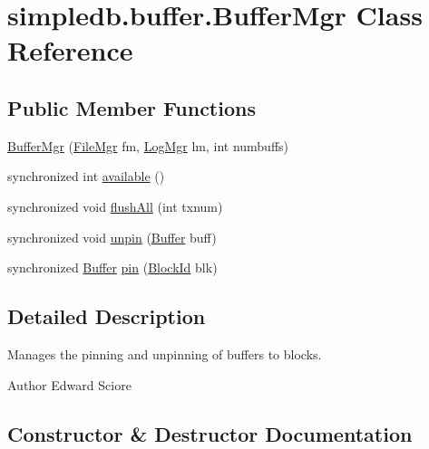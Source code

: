 \hypertarget{classsimpledb_1_1buffer_1_1BufferMgr}{}\section{simpledb.\+buffer.\+Buffer\+Mgr Class Reference}
\label{classsimpledb_1_1buffer_1_1BufferMgr}
\subsection*{Public Member Functions}
\begin{DoxyCompactItemize}
\item 
\hyperlink{classsimpledb_1_1buffer_1_1BufferMgr_a902992b92f80e884e735f164666b7f8e}{Buffer\+Mgr} (\hyperlink{classsimpledb_1_1file_1_1FileMgr}{File\+Mgr} fm, \hyperlink{classsimpledb_1_1log_1_1LogMgr}{Log\+Mgr} lm, int numbuffs)
\item 
synchronized int \hyperlink{classsimpledb_1_1buffer_1_1BufferMgr_a39e0c2c3184bbf6c15e3c7b2bd4151e0}{available} ()
\item 
synchronized void \hyperlink{classsimpledb_1_1buffer_1_1BufferMgr_a0f77a2fcb04ff531bf44afb40860f10f}{flush\+All} (int txnum)
\item 
synchronized void \hyperlink{classsimpledb_1_1buffer_1_1BufferMgr_af8cfce0647ac8fbf190908c005bbb49a}{unpin} (\hyperlink{classsimpledb_1_1buffer_1_1Buffer}{Buffer} buff)
\item 
synchronized \hyperlink{classsimpledb_1_1buffer_1_1Buffer}{Buffer} \hyperlink{classsimpledb_1_1buffer_1_1BufferMgr_a8ce62cea253140d8b2faf76059f6808c}{pin} (\hyperlink{classsimpledb_1_1file_1_1BlockId}{Block\+Id} blk)
\end{DoxyCompactItemize}


\subsection{Detailed Description}
Manages the pinning and unpinning of buffers to blocks. \begin{DoxyAuthor}{Author}
Edward Sciore 
\end{DoxyAuthor}


\subsection{Constructor \& Destructor Documentation}
\mbox{\label{classsimpledb_1_1buffer_1_1BufferMgr_a902992b92f80e884e735f164666b7f8e}} 
